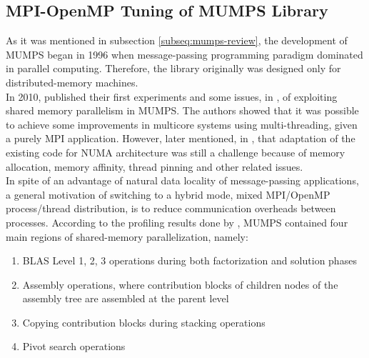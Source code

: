 \subsection{MPI-OpenMP Tuning of MUMPS Library}
\label{subseq:mpi-openmp}


As it was mentioned in subsection \ref{subseq:mumps-review}, the development of MUMPS began in 1996 when message-passing programming paradigm dominated in parallel computing. Therefore, the library originally was designed only for distributed-memory machines.\\

In 2010,  \citeauthor{chowdhury2010some} published their first experiments and some issues, in \cite{chowdhury2010some}, of exploiting shared memory parallelism in MUMPS. The authors showed that it was possible to achieve some improvements in multicore systems using multi-threading, given a purely MPI application. However, later \citeauthor{l2013introduction} mentioned, in \cite{l2013introduction}, that adaptation of the existing code for NUMA architecture was still a challenge because of memory allocation, memory affinity, thread pinning and other related issues.\\


In spite of an advantage of natural data locality of message-passing applications, a general motivation of switching to a hybrid mode, mixed MPI/OpenMP process/thread distribution, is to reduce communication overheads between processes. According to the profiling results done by \citeauthor{chowdhury2010some}, MUMPS contained four main regions of shared-memory parallelization, namely: 

\begin{enumerate}

	\item BLAS Level 1, 2, 3 operations during both factorization and solution phases \label{openmp-blocks-1}
	
	\item Assembly operations, where contribution blocks of children nodes of the assembly tree are assembled at the parent level \label{openmp-blocks-2}
	
	\item Copying contribution blocks during stacking operations \label{openmp-blocks-3}
	
	\item Pivot search operations \label{openmp-blocks-4}

\end{enumerate}


